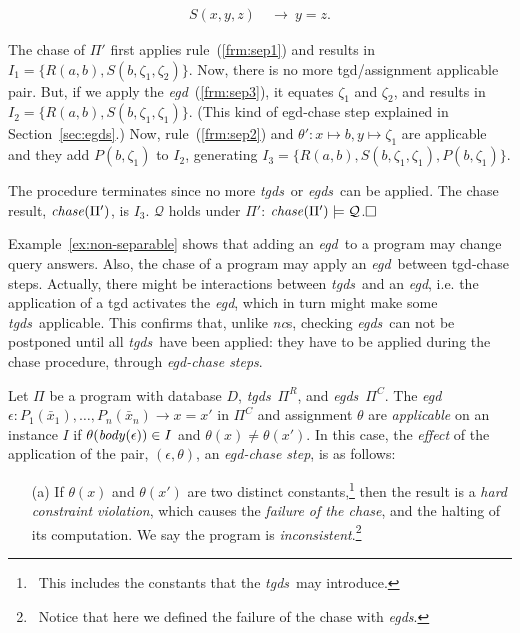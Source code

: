 \documentclass[format=acmsmall, review=false, screen=true]{acmart}
\newcommand{\boxtheorem}{\ensuremath{\hfill \Box}}
\newcommand{\mc}[1]{\mathcal{ #1}}
\newcommand{\nit}[1]{{\it #1}}
\newcommand{\nc}{{\em nc}}
\newcommand{\rules}{\Pi^{R}}
\newcommand{\constraints}{\Pi^{C}}
\newcommand{\prg}{\Pi}
\newcommand{\vectt}[1]{\bar{#1}}
\newcommand{\egds}{{\em egds}}
\newcommand{\egd}{{\em egd}}
\newcommand{\tgds}{{\em tgds}}
\begin{document}
{\begin{example}
\vspace{-0.7cm}
\begin{align}
S(x,y,z) ~&\rightarrow~ y=z.\label{frm:sep3}
\end{align}


\noindent The chase of $\prg'$ first applies rule~(\ref{frm:sep1}) and results in $I_1=\{R(a,b),S(b,\zeta_1,\zeta_2)\}$. Now, there is no more tgd/assignment applicable pair. But, if we apply the \egd~(\ref{frm:sep3}), it equates $\zeta_1$ and $\zeta_2$, and results in $I_2=\{R(a,b),S(b,\zeta_1,\zeta_1)\}$. (This kind of egd-chase step explained in Section~\ref{sec:egds}.) Now, rule~(\ref{frm:sep2}) and $\theta': x\mapsto b, y\mapsto \zeta_1$ are applicable and they add $P(b,\zeta_1)$ to $I_2$, generating $I_3=\{R(a,b),S(b,\zeta_1,\zeta_1),P(b,\zeta_1)\}$.

The procedure terminates since no more \tgds \ or \egds \ can be applied. The chase result, $\nit{chase}(\prg')$, is $I_3$. $\mc{Q}$ holds under $\prg'$: $\nit{chase}(\prg') \models \mc{Q}$.\boxtheorem\end{example}

Example~\ref{ex:non-separable} shows that adding an \egd \ to a program may change query answers. Also, the chase of a program may apply an \egd \ between tgd-chase steps. Actually, there might be interactions between \tgds \ and an \egd, i.e. the application of a tgd activates the \egd, which in turn might make some \tgds \ applicable. This confirms that, unlike \nc s, checking \egds \ can not be postponed until all \tgds \ have been applied: they have to be applied during the chase procedure, through {\em egd-chase steps}.

Let $\prg$ be a program with database $D$, \tgds \ $\rules$, and \egds \ $\constraints$. The \egd \ $\epsilon:P_1(\vectt{x}_1), \ldots, P_n(\vectt{x}_n) \rightarrow x=x'$ in $\constraints$ and assignment $\theta$ are {\em applicable} on an instance $I$ if $\theta(\nit{body}(\epsilon)) \in I$ and $\theta(x)\neq\theta(x')$. In this case, the {\em effect} of the application of the pair, $(\epsilon,\theta)$, an {\em egd-chase step}, is as follows:

\begin{itemize}
  \item[(a)] If $\theta(x)$ and $\theta(x')$ are two distinct constants,\footnote{\ This includes the constants that the \tgds \ may introduce.} then the result is a {\em hard constraint violation}, which causes the {\em failure of the chase}, and the halting of its computation. We say the program is {\em inconsistent}.\footnote{\ Notice that here we defined the failure of the chase with \egds.}


\end{itemize}}
\end{document}
